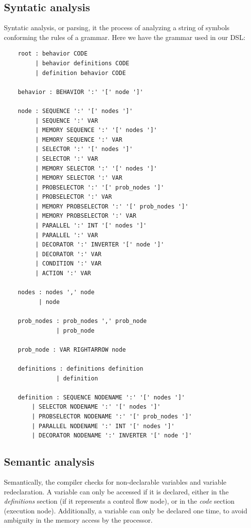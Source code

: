 \documentclass[a4paper,UKenglish,cleveref, autoref, thm-restate]{oasics-v2019}
\begin{document}
\subsection{Syntatic analysis}
Syntatic analysis, or parsing, it the process of analyzing a string of symbols conforming the rules of a grammar. Here we have the grammar used in our DSL:
\begin{lstlisting}
    root : behavior CODE
         | behavior definitions CODE
         | definition behavior CODE

    behavior : BEHAVIOR ':' '[' node ']'

    node : SEQUENCE ':' '[' nodes ']'
         | SEQUENCE ':' VAR
         | MEMORY SEQUENCE ':' '[' nodes ']'
         | MEMORY SEQUENCE ':' VAR
         | SELECTOR ':' '[' nodes ']'
         | SELECTOR ':' VAR
         | MEMORY SELECTOR ':' '[' nodes ']'
         | MEMORY SELECTOR ':' VAR
         | PROBSELECTOR ':' '[' prob_nodes ']'
         | PROBSELECTOR ':' VAR
         | MEMORY PROBSELECTOR ':' '[' prob_nodes ']'
         | MEMORY PROBSELECTOR ':' VAR
         | PARALLEL ':' INT '[' nodes ']'
         | PARALLEL ':' VAR
         | DECORATOR ':' INVERTER '[' node ']'
         | DECORATOR ':' VAR
         | CONDITION ':' VAR
         | ACTION ':' VAR
    
    nodes : nodes ',' node
          | node
    
    prob_nodes : prob_nodes ',' prob_node
               | prob_node
    
    prob_node : VAR RIGHTARROW node

    definitions : definitions definition
               | definition

    definition : SEQUENCE NODENAME ':' '[' nodes ']'
        | SELECTOR NODENAME ':' '[' nodes ']'
        | PROBSELECTOR NODENAME ':' '[' prob_nodes ']'
        | PARALLEL NODENAME ':' INT '[' nodes ']'
        | DECORATOR NODENAME ':' INVERTER '[' node ']'
\end{lstlisting}

\subsection{Semantic analysis}
Semantically, the compiler checks for non-declarable variables and variable redeclaration.
A variable can only be accessed if it is declared, either in the \textit{definitions} section (if it represents a control flow node), or in the \textit{code} section (execution node).
Additionally, a variable can only be declared one time, to avoid ambiguity in the memory access by the processor.
\end{document}
